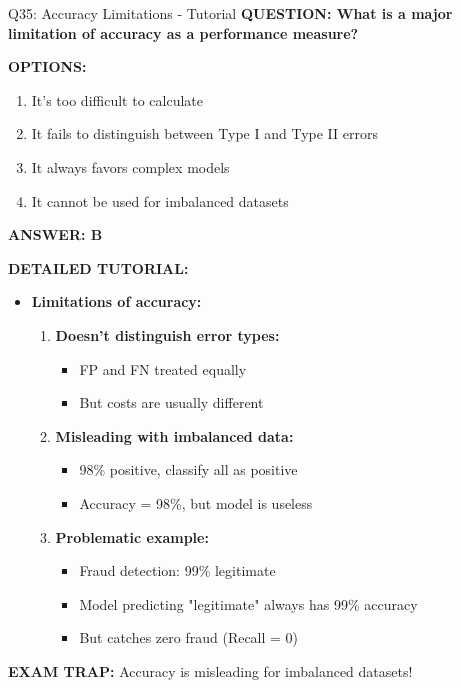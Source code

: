 \documentclass[8pt]{beamer}
\begin{document}
	\begin{frame}{Q35: Accuracy Limitations - Tutorial}
		\fontsize{6.5}{7.5}\selectfont
		\textbf{QUESTION: What is a major limitation of accuracy as a performance measure?}
		
		\vspace{0.1cm}
		\textbf{OPTIONS:}
		\begin{enumerate}
			\item It's too difficult to calculate
			\item It fails to distinguish between Type I and Type II errors
			\item It always favors complex models
			\item It cannot be used for imbalanced datasets
		\end{enumerate}
		
		\vspace{0.1cm}
		\textcolor{myblue}{\textbf{ANSWER: B}}
		
		\vspace{0.1cm}
		\textbf{DETAILED TUTORIAL:}
		\begin{itemize}
			\item \textbf{Limitations of accuracy:}
			\begin{enumerate}
				\item \textbf{Doesn't distinguish error types:}
				\begin{itemize}
					\item FP and FN treated equally
					\item But costs are usually different
				\end{itemize}
				\item \textbf{Misleading with imbalanced data:}
				\begin{itemize}
					\item 98\% positive, classify all as positive
					\item Accuracy = 98\%, but model is useless
				\end{itemize}
				\item \textbf{Problematic example:}
				\begin{itemize}
					\item Fraud detection: 99\% legitimate
					\item Model predicting "legitimate" always has 99\% accuracy
					\item But catches zero fraud (Recall = 0)
				\end{itemize}
			\end{enumerate}
		\end{itemize}
		
		\textcolor{myred}{\textbf{EXAM TRAP:}} Accuracy is \textcolor{myblue}{misleading for imbalanced datasets}!
	\end{frame}
	
\end{document}
